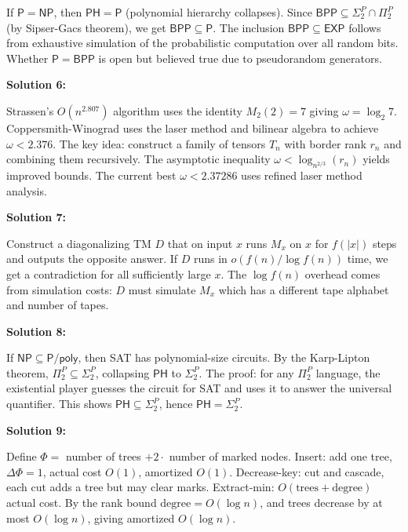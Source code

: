 \documentclass[12pt,a4paper]{exam}
\begin{document}
If $\mathsf{P} = \mathsf{NP}$, then $\mathsf{PH} = \mathsf{P}$ (polynomial hierarchy collapses). Since $\mathsf{BPP} \subseteq \Sigma_2^P \cap \Pi_2^P$ (by Sipser-Gacs theorem), we get $\mathsf{BPP} \subseteq \mathsf{P}$. The inclusion $\mathsf{BPP} \subseteq \mathsf{EXP}$ follows from exhaustive simulation of the probabilistic computation over all random bits. Whether $\mathsf{P} = \mathsf{BPP}$ is open but believed true due to pseudorandom generators.

\vspace{0.5cm}

\textbf{Solution 6:}

Strassen's $O(n^{2.807})$ algorithm uses the identity $M_2(2) = 7$ giving $\omega = \log_2 7$. Coppersmith-Winograd uses the laser method and bilinear algebra to achieve $\omega < 2.376$. The key idea: construct a family of tensors $T_n$ with border rank $r_n$ and combining them recursively. The asymptotic inequality $\omega < \log_{n^{2/3}}(r_n)$ yields improved bounds. The current best $\omega < 2.37286$ uses refined laser method analysis.

\vspace{0.5cm}

\textbf{Solution 7:}

Construct a diagonalizing TM $D$ that on input $x$ runs $M_x$ on $x$ for $f(|x|)$ steps and outputs the opposite answer. If $D$ runs in $o(f(n)/\log f(n))$ time, we get a contradiction for all sufficiently large $x$. The $\log f(n)$ overhead comes from simulation costs: $D$ must simulate $M_x$ which has a different tape alphabet and number of tapes.

\vspace{0.5cm}

\textbf{Solution 8:}

If $\mathsf{NP} \subseteq \mathsf{P}/\mathsf{poly}$, then SAT has polynomial-size circuits. By the Karp-Lipton theorem, $\Pi_2^P \subseteq \Sigma_2^P$, collapsing $\mathsf{PH}$ to $\Sigma_2^P$. The proof: for any $\Pi_2^P$ language, the existential player guesses the circuit for SAT and uses it to answer the universal quantifier. This shows $\mathsf{PH} \subseteq \Sigma_2^P$, hence $\mathsf{PH} = \Sigma_2^P$.

\vspace{0.5cm}

\textbf{Solution 9:}

Define $\Phi =$ number of trees $+ 2 \cdot$ number of marked nodes. Insert: add one tree, $\Delta\Phi = 1$, actual cost $O(1)$, amortized $O(1)$. Decrease-key: cut and cascade, each cut adds a tree but may clear marks. Extract-min: $O(\text{trees} + \text{degree})$ actual cost. By the rank bound $\text{degree} = O(\log n)$, and trees decrease by at most $O(\log n)$, giving amortized $O(\log n)$.
\end{document}
